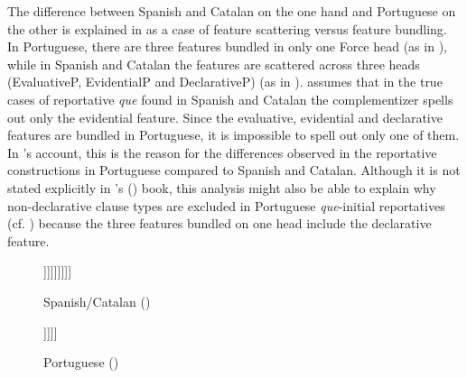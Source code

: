 The difference between Spanish and Catalan  on the one hand and Portuguese on the other  is explained in \citet{Corr2016} as a case of feature scattering versus feature bundling. In Portuguese, there are three features bundled in only one Force head (as in ), while in Spanish and Catalan the features are scattered across three heads (EvaluativeP, EvidentialP and DeclarativeP) (as in ). \citet{Corr2016} assumes that in the true cases of reportative \emph{que} found in Spanish and Catalan the complementizer spells out only the evidential feature. Since the evaluative, evidential and declarative features  are bundled in Portuguese,  it  is impossible to spell out only one of them. In \citeauthor{Corr2016}'s account, this  is the reason for the differences observed in the reportative constructions in Portuguese compared to Spanish and Catalan. Although it is not stated explicitly in \citeauthor{Corr2016}'s (\citeyear{Corr2016}) book, this analysis might also be able to explain why   non-declarative clause types are excluded in  Portuguese \emph{que}-initial reportatives (cf. ) because the three features bundled on one head include the declarative feature. 

\begin{figure}
\caption{\label{struc:scatsp}Spanish/Catalan (\citealt[187: ex 81]{Corr2016}) }
\begin{forest}
	[FP1 
	[~] 
	[FP1' 
	[+SA]  
	[FP2 
	[~] 
	[FP2'
	[+EVAL]
	[FP3
	[~] 
	[FP3'
	[+EVID]
	[FP4 
	[~] 
	[FP4'
	[+DECL]
	[\dots 
	]]]]]]]]]	
\end{forest}
\end{figure}

\begin{figure}
\caption{\label{struc:bundpt}Portuguese (\citealt[187: ex 80]{Corr2016})}
\begin{forest}
	[FP1 
	[~] 
	[FP1' 
	[+SA]  
	[FP2 
	[~] 
	[FP2'
	[+EVAL\\+EVID\\+DECL]
	[\dots 
	]]]]]	
\end{forest}
\end{figure}

